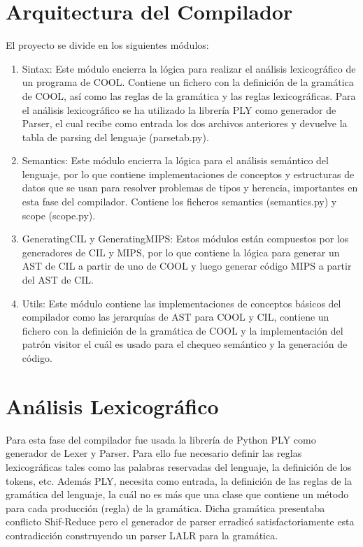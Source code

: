 \documentclass[]{article}
\begin{document}
\section{Arquitectura del Compilador}
El proyecto se divide en los siguientes m\'odulos:
\begin{enumerate}
	\item Sintax: Este m\'odulo encierra la l\'ogica para realizar el an\'alisis lexicogr\'afico
	de un programa de COOL. Contiene un fichero con la definici\'on de la gram\'atica
	de COOL, as\'i como las reglas de la gram\'atica y las reglas lexicogr\'aficas. Para el
	an\'alisis lexicogr\'afico se ha utilizado la librer\'ia PLY como generador de Parser,
	el cual recibe como entrada los dos archivos anteriores y devuelve la tabla de
	parsing del lenguaje (parsetab.py).
	\item Semantics: Este m\'odulo encierra la l\'ogica para el an\'alisis sem\'antico del lenguaje, por lo que contiene implementaciones de conceptos
	y estructuras de datos que se usan para resolver problemas de tipos y herencia, importantes en esta fase
	del compilador. Contiene los ficheros semantics (semantics.py) y scope (scope.py).
	\item GeneratingCIL y GeneratingMIPS: Estos m\'odulos est\'an compuestos por los generadores de CIL y MIPS,
	por lo que contiene la l\'ogica para generar un AST de CIL a partir de uno de
	COOL y luego generar c\'odigo MIPS a partir del AST de CIL.
	\item Utils: Este m\'odulo contiene las implementaciones de conceptos b\'asicos del
	compilador como las jerarqu\'ias de AST para COOL y CIL, contiene un fichero con la definici\'on de la gram\'atica
	de COOL y la implementaci\'on del patr\'on
	visitor el cu\'al es usado para el chequeo sem\'antico y la generaci\'on de c\'odigo.
\end{enumerate}
\section{An\'alisis Lexicogr\'afico}
Para esta fase del compilador fue usada la librer\'ia de Python PLY como generador de
Lexer y Parser.
Para ello fue necesario definir las reglas lexicogr\'aficas tales como las palabras reservadas
del lenguaje, la definici\'on de los tokens, etc.
Adem\'as PLY, necesita como entrada, la definici\'on de las reglas de la gram\'atica del
lenguaje, la cu\'al no es m\'as que una clase que contiene un m\'etodo para cada producci\'on
(regla) de la gram\'atica. Dicha gram\'atica presentaba conflicto Shif-Reduce pero
el generador de parser erradic\'o satisfactoriamente esta contradicci\'on construyendo un
parser LALR para la gram\'atica.
\end{document}
